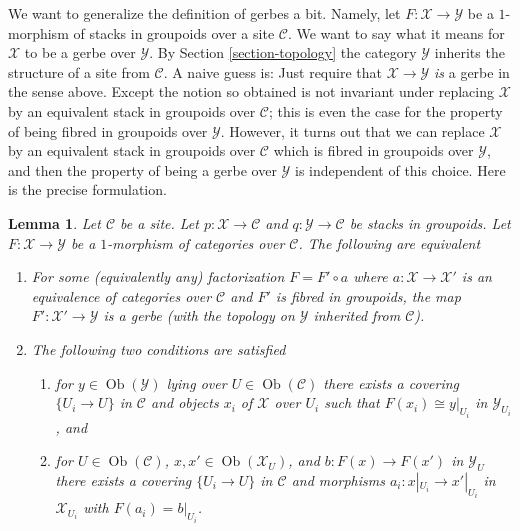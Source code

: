 \documentclass{stacks-project}
\theoremstyle{plain}
\newtheorem{lemma}[subsection]{Lemma}
\theoremstyle{definition}
\theoremstyle{remark}
\numberwithin{equation}{subsection}
\def\Ob{\mathop{\mathrm{Ob}}\nolimits}
\begin{document}
\noindent
We want to generalize the definition of gerbes a bit. Namely, let
$F : \mathcal{X} \to \mathcal{Y}$ be a $1$-morphism of stacks in groupoids
over a site $\mathcal{C}$. We want to say what it
means for $\mathcal{X}$ to be a gerbe over $\mathcal{Y}$. By
Section \ref{section-topology}
the category $\mathcal{Y}$ inherits the structure of a site from
$\mathcal{C}$. A naive guess is: Just require that
$\mathcal{X} \to \mathcal{Y}$ {\it is} a gerbe in the sense above. Except
the notion so obtained is not invariant under replacing $\mathcal{X}$
by an equivalent stack in groupoids over $\mathcal{C}$; this is even the
case for the property of being fibred in groupoids over $\mathcal{Y}$.
However, it turns out that we can replace $\mathcal{X}$ by an equivalent
stack in groupoids over $\mathcal{C}$ which is fibred in groupoids over
$\mathcal{Y}$, and then the property of being a gerbe over $\mathcal{Y}$
is independent of this choice. Here is the precise formulation.

\begin{lemma}
\label{lemma-when-gerbe}
Let $\mathcal{C}$ be a site. Let $p : \mathcal{X} \to \mathcal{C}$
and $q : \mathcal{Y} \to \mathcal{C}$ be stacks in groupoids.
Let $F : \mathcal{X} \to \mathcal{Y}$ be a $1$-morphism of categories
over $\mathcal{C}$. The following are equivalent
\begin{enumerate}
\item For some (equivalently any) factorization $F = F' \circ a$ where
$a : \mathcal{X} \to \mathcal{X}'$ is an equivalence of categories over
$\mathcal{C}$ and $F'$ is fibred in groupoids, the map
$F' : \mathcal{X}' \to \mathcal{Y}$ is a gerbe (with the topology
on $\mathcal{Y}$ inherited from $\mathcal{C}$).
\item The following two conditions are satisfied
\begin{enumerate}
\item for $y \in \Ob(\mathcal{Y})$ lying over
$U \in \Ob(\mathcal{C})$ there exists a covering
$\{U_i \to U\}$ in $\mathcal{C}$ and objects $x_i$ of $\mathcal{X}$
over $U_i$ such that $F(x_i) \cong y|_{U_i}$ in $\mathcal{Y}_{U_i}$, and
\item for $U \in \Ob(\mathcal{C})$,
$x, x' \in \Ob(\mathcal{X}_U)$, and $b : F(x) \to F(x')$ in
$\mathcal{Y}_U$ there exists
a covering $\{U_i \to U\}$ in $\mathcal{C}$ and morphisms
$a_i : x|_{U_i} \to x'|_{U_i}$ in $\mathcal{X}_{U_i}$ with
$F(a_i) = b|_{U_i}$.
\end{enumerate}
\end{enumerate}
\end{lemma}
\end{document}
